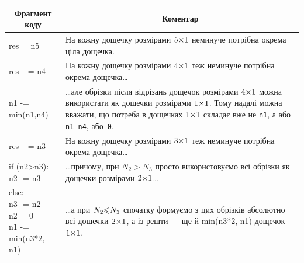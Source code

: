 \documentclass[14pt,a4paper]{extarticle}
\begin{document}
{

\def\leftColumnWidth{0.35\textwidth}
\def\rightColumnWidth{0.6\textwidth}
\def\leftCell#1{\ttfamily\obeylines\obeyspaces\frenchspacing
\begin{minipage}[t]{\leftColumnWidth}
{\ttfamily\obeylines\obeyspaces\frenchspacing #1}
\end{minipage}}
\def\rightCell#1{
\begin{minipage}[t]{\rightColumnWidth}
{#1}
\end{minipage}\medskip}

\def\tabbb{\hspace*{2em}}

\begin{longtable}{|p{\leftColumnWidth}|p{\rightColumnWidth}|}
\hline
\multicolumn{1}{|c|}{Фрагмент коду} 
&
\multicolumn{1}{|c|}{Коментар}
\\\hline\endhead

\leftCell{res = n5}
&
\rightCell{На кожну дощечку розмірами $5{\times}1$ неминуче потрібна окрема ціла дощечка.}
\\\hline

\leftCell{res += n4}
&
\rightCell{На кожну дощечку розмірами $4{\times}1$ теж неминуче потрібна окрема дощечка\dots}
\\\hline

\leftCell{n1 -= min(n1,n4)}
&
\rightCell{\dots{}але обрізки після відрізань дощечок розмірами $4{\times}1$ можна використати як дощечки розмірами $1{\times}1$. Тому надалі можна вважати, що потреба в дощечках $1{\times}1$ складає вже не \texttt{n1}, а або \texttt{n1–n4}, або~\texttt{0}.}
\\\hline

\leftCell{res += n3}
&
\rightCell{На кожну дощечку розмірами $3{\times}1$ теж неминуче потрібна окрема дощечка\dots}
\\\hline

\leftCell{if (n2>n3):\\
\tabbb{}n2 -= n3}
&
\rightCell{\dots{}причому, при $N_2{>}N_3$ просто використовуємо всі обрізки як дощечки розмірами $2{\times}1$\dots}
\\\hline

\leftCell{else:\\
\tabbb{}n3 -= n2\\
\tabbb{}n2 = 0\\
\tabbb{}n1 -= min(n3*2, n1)}
&
\rightCell{\dots{}а при $N_2{\leqslant}N_3$ спочатку формуємо з цих обрізків абсолютно всі дощечки $2{\times}1$, а із решти — ще й min(n3*2, n1) дощечок $1{\times}1$.}
\\\hline


\end{longtable}}
\end{document}
